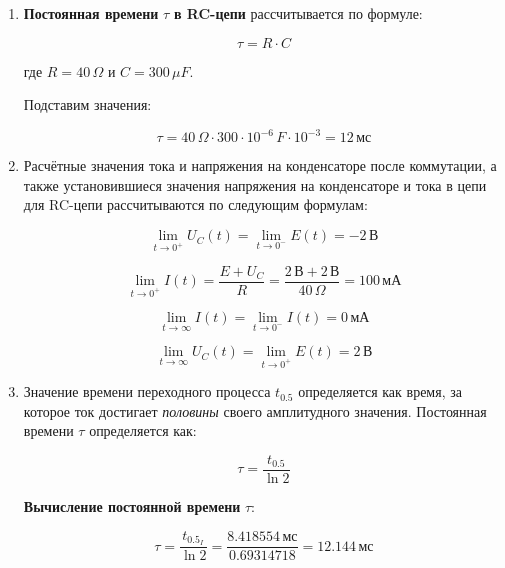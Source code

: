 \begin{enumerate}
	\item \textbf{Постоянная времени } $\tau$ \textbf{в RC-цепи} рассчитывается по формуле:

	      \[
		      \tau = R \cdot C
	      \]

	      где $R = 40 \, \Omega$ и $C = 300 \, \mu F$.

	      Подставим значения:

	      \[
		      \tau = 40 \, \Omega \cdot 300 \cdot 10^{-6} \, F \cdot 10^{-3} = 12 \, \text{мс}
	      \]

	\item Расчётные значения тока и напряжения на конденсаторе после коммутации, а также установившиеся значения напряжения на конденсаторе и тока в цепи для RC-цепи рассчитываются по следующим формулам:

	      \[
		      \lim_{t \to 0^+} U_C(t) = \lim_{t \to 0^-} E(t) = -2 \, \text{В}
	      \]

	      \[
		      \lim_{t \to 0^+} I(t) = \frac{E + U_C}{R} = \frac{2\, \text{В} + 2\, \text{В}}{40 \, \Omega} = 100 \, \text{мА}
	      \]

	      \[
		      \lim_{t \to \infty} I(t) = \lim_{t \to 0^-} I(t) = 0 \, \text{мА}
	      \]

	      \[
		      \lim_{t \to \infty} U_C(t) = \lim_{t \to 0^+} E(t) = 2 \, \text{В}
	      \]

	\item Значение времени переходного процесса \( t_{0.5} \) определяется как время, за которое ток достигает \textit{половины} своего амплитудного значения. Постоянная времени \( \tau \) определяется как:

	      \[
		      \tau = \frac{t_{0.5}}{\ln 2}
	      \]

	      \textbf{Вычисление постоянной времени } \( \tau \):

	      \[
		      \tau = \frac{t_{0.5_I}}{\ln 2} = \frac{8.418554 \, \text{мс}}{0.69314718} = 12.144 \, \text{мс}
	      \]

\end{enumerate}
